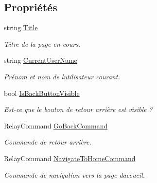 \subsection*{Propriétés}
\begin{DoxyCompactItemize}
\item 
string \hyperlink{class_boxes_1_1_view_models_1_1_shell_view_model_a1640979a1fef171c4923787cef2e551f}{Title}
\begin{DoxyCompactList}\small\item\em Titre de la page en cours. \end{DoxyCompactList}\item 
string \hyperlink{class_boxes_1_1_view_models_1_1_shell_view_model_a1a6d908df3c288e9a5239a04eb047eb4}{Current\+User\+Name}
\begin{DoxyCompactList}\small\item\em Prénom et nom de l\textquotesingle{}utilisateur courant. \end{DoxyCompactList}\item 
bool \hyperlink{class_boxes_1_1_view_models_1_1_shell_view_model_a5c1cb0f080c2bceb2419be4586b839f3}{Is\+Back\+Button\+Visible}
\begin{DoxyCompactList}\small\item\em Est-\/ce que le bouton de retour arrière est visible ? \end{DoxyCompactList}\item 
Relay\+Command \hyperlink{class_boxes_1_1_view_models_1_1_shell_view_model_a79515d296d20f7589540705d0e708d2f}{Go\+Back\+Command}
\begin{DoxyCompactList}\small\item\em Commande de retour arrière. \end{DoxyCompactList}\item 
Relay\+Command \hyperlink{class_boxes_1_1_view_models_1_1_shell_view_model_a9e61307917c9bb6132b3506c3f96c827}{Navigate\+To\+Home\+Command}
\begin{DoxyCompactList}\small\item\em Commande de navigation vers la page d\textquotesingle{}accueil. \end{DoxyCompactList}\item 

\end{DoxyCompactItemize}
